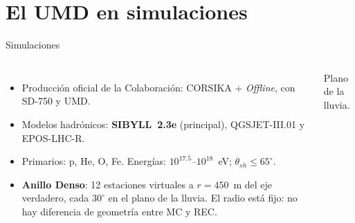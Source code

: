 \documentclass[aspectratio=169,11pt]{beamer}
\begin{document}
\section{El UMD en simulaciones}


\begin{frame}{Simulaciones}
  \begin{columns}[c]
      \small
      \begin{itemize}
        \item Producción oficial de la Colaboración: CORSIKA + \emph{Offline},
          con SD-750 y UMD.
        \item Modelos hadrónicos: \textbf{SIBYLL~2.3e} (principal),
          QGSJET-III.01 y EPOS-LHC-R.
        \item Primarios: p, He, O, Fe. Energías: $10^{17.5}$--$10^{18}$~eV;
          $\theta_{sh}\le65^\circ$.
        \item \textbf{Anillo Denso}: 12 estaciones virtuales a
          $r=450$~m del eje verdadero, cada $30^\circ$ en el plano de la lluvia.
          El radio está fijo: no hay diferencia de geometría entre MC y REC.
      \end{itemize}
      \centering

      \vspace{0.3em}
      {\scriptsize Plano de la lluvia.}
  \end{columns}
\end{frame}
\end{document}
